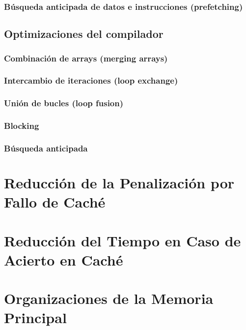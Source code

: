 \documentclass[12pt,onecolumn]{memoir}
\begin{document}
\subsubsection{Búsqueda anticipada de datos e instrucciones (prefetching)}

\subsection{Optimizaciones del compilador}

\subsubsection{Combinación de arrays (merging arrays)}

\subsubsection{Intercambio de iteraciones (loop exchange)}

\subsubsection{Unión de bucles (loop fusion)}

\subsubsection{Blocking}

\subsubsection{Búsqueda anticipada}


\section{Reducción de la Penalización por Fallo de Caché}

\section{Reducción del Tiempo en Caso de Acierto en Caché}

\section{Organizaciones de la Memoria Principal}

 
 
\end{document}
